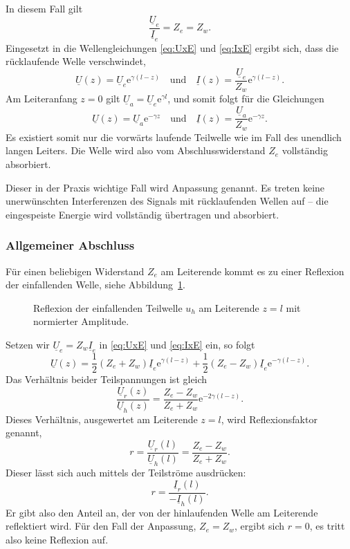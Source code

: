 \documentclass[paper=a4, parskip=half-, ngerman, fontsize=11pt]{scrreprt}
\begin{document}
In diesem Fall gilt
\[ \frac{\underline{U}_{e}}{\underline{I}_{e}} = Z_{e} = Z_{w}. \]
Eingesetzt in die Wellengleichungen \eqref{eq:UxE} und \eqref{eq:IxE} ergibt sich, dass die rücklaufende Welle
verschwindet,
\[ \underline{U}(z) = \underline{U}_{e} \mathrm{e}^{\gamma (l - z)} \quad \text{und} \quad
\underline{I}(z) = \frac{\underline{U}_{e}}{Z_{w}} \mathrm{e}^{\gamma (l - z)}. \]
Am Leiteranfang $z = 0$ gilt $\underline{U}_{a} = \underline{U}_{e} \mathrm{e}^{\gamma l}$, und somit
folgt für die Gleichungen
\[ \underline{U}(z) = \underline{U}_{a} \mathrm{e}^{- \gamma z} \quad \text{und} \quad
\underline{I}(z) = \frac{\underline{U}_{a}}{Z_{w}} \mathrm{e}^{- \gamma z}. \]
Es existiert somit nur die vorwärts laufende Teilwelle wie im Fall des unendlich langen Leiters. Die Welle wird also
vom Abschlusswiderstand $Z_{e}$ vollständig absorbiert.

Dieser in der Praxis wichtige Fall wird Anpassung genannt. Es treten keine unerwünschten Interferenzen des Signals mit
rücklaufenden Wellen auf -- die eingespeiste Energie wird vollständig übertragen und absorbiert.

\subsubsection{Allgemeiner Abschluss}
Für einen beliebigen Widerstand $Z_{e}$ am Leiterende kommt es zu einer Reflexion der einfallenden Welle, siehe
Abbildung~\ref{ReflektierteWelle}.
\begin{figure}[!htb]
    \begin{center}
        
        \caption{Reflexion der einfallenden Teilwelle $u_{h}$ am Leiterende $z=l$ mit normierter Amplitude.}
        \label{ReflektierteWelle}
    \end{center}
\end{figure}

Setzen wir $\underline{U}_{e} = Z_{w} \underline{I}_{e}$ in \eqref{eq:UxE} und \eqref{eq:IxE} ein, so folgt
\[
\underline{U}(z) = \frac{1}{2} (Z_{e} + Z_{w}) \underline{I}_{e} \mathrm{e}^{\gamma (l - z)}
+
\frac{1}{2} (Z_{e} - Z_{w}) \underline{I}_{e} \mathrm{e}^{- \gamma (l - z)} .
\]
Das Verhältnis beider Teilspannungen ist gleich
\[
\frac{\underline{U}_{r}(z)}{\underline{U}_{h}(z)} = \frac{Z_{e}-Z_{w}}{Z_{e}+Z_{w}} \mathrm{e}^{-2 \gamma (l-z)}.
\]
Dieses Verhältnis, ausgewertet am Leiterende $z = l$, wird Reflexionsfaktor genannt,
\begin{equation}
r = \frac{\underline{U}_{r}(l)}{\underline{U}_{h}(l)} = \frac{Z_{e}-Z_{w}}{Z_{e}+Z_{w}} \label{eq:RFactor}.
\end{equation}
Dieser lässt sich auch mittels der Teilströme ausdrücken:
\begin{equation*}
    r = \frac{\underline{I}_{r}(l)}{- \underline{I}_{h}(l)}.
\end{equation*}
Er gibt also den Anteil an, der von der hinlaufenden Welle am Leiterende reflektiert wird. Für den Fall der Anpassung,
$Z_{e} = Z_{w}$, ergibt sich $r = 0$, es tritt also keine Reflexion auf.
\end{document}
